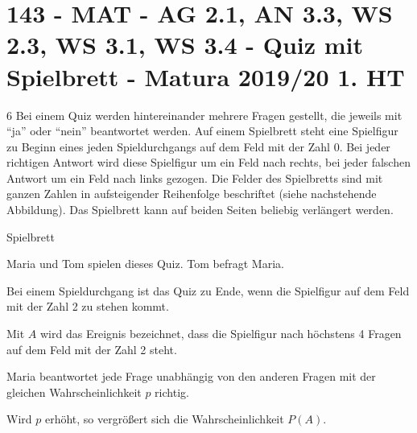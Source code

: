\section{143 - MAT - AG 2.1, AN 3.3, WS 2.3, WS 3.1, WS 3.4 - Quiz mit Spielbrett - Matura 2019/20 1. HT}

\begin{langesbeispiel}\item[6] %
Bei einem Quiz werden hintereinander mehrere Fragen gestellt, die jeweils mit "`ja"' oder "`nein"' beantwortet werden. Auf einem Spielbrett steht eine Spielfigur zu Beginn eines jeden Spieldurchgangs auf dem Feld mit der Zahl 0. Bei jeder richtigen Antwort wird diese Spielfigur um ein Feld nach rechts, bei jeder falschen Antwort um ein Feld nach links gezogen. Die Felder des Spielbretts sind mit ganzen Zahlen in aufsteigender Reihenfolge beschriftet (siehe nachstehende Abbildung). Das Spielbrett kann auf beiden Seiten beliebig verlängert werden.
\begin{center}
Spielbrett

\end{center}

Maria und Tom spielen dieses Quiz. Tom befragt Maria.%

\begin{aufgabenstellung}
\item Bei einem Spieldurchgang ist das Quiz zu Ende, wenn die Spielfigur auf dem Feld mit der Zahl 2 zu stehen kommt.

Mit $A$ wird das Ereignis bezeichnet, dass die Spielfigur nach höchstens 4 Fragen auf dem Feld mit der Zahl 2 steht.

Maria beantwortet jede Frage unabhängig von den anderen Fragen mit der gleichen Wahrscheinlichkeit $p$ richtig.%


Wird $p$ erhöht, so vergrößert sich die Wahrscheinlichkeit $P(A)$.


\end{aufgabenstellung}
\end{langesbeispiel}
